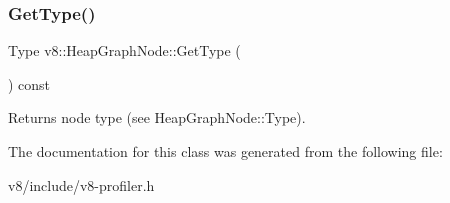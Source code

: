 \subsubsection{\texorpdfstring{Get\+Type()}{GetType()}}
{\footnotesize\ttfamily Type v8\+::\+Heap\+Graph\+Node\+::\+Get\+Type (\begin{DoxyParamCaption}{ }\end{DoxyParamCaption}) const}

Returns node type (see Heap\+Graph\+Node\+::\+Type). 

The documentation for this class was generated from the following file\+:\begin{DoxyCompactItemize}
\item 
v8/include/v8-\/profiler.\+h\end{DoxyCompactItemize}
